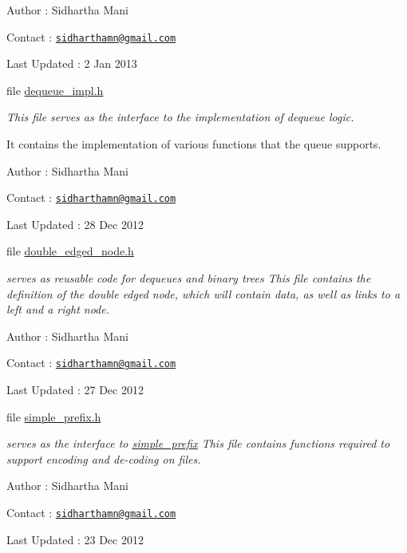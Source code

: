 \begin{DoxyCompactItemize}
\begin{DoxyCompactList}
 Author \-: Sidhartha Mani\par
 Contact \-: \href{mailto:sidharthamn@gmail.com}{\tt sidharthamn@gmail.\-com} \par
 Last Updated \-: 2 Jan 2013\par
 \end{DoxyCompactList}\item 
file \hyperlink{dequeue__impl_8h}{dequeue\-\_\-impl.\-h}
\begin{DoxyCompactList}\small\item\em This file serves as the interface to the implementation of dequeue logic. \par
 It contains the implementation of various functions that the queue supports.\par
 Author \-: Sidhartha Mani\par
 Contact \-: \href{mailto:sidharthamn@gmail.com}{\tt sidharthamn@gmail.\-com} \par
 Last Updated \-: 28 Dec 2012\par
 \end{DoxyCompactList}\item 
file \hyperlink{double__edged__node_8h}{double\-\_\-edged\-\_\-node.\-h}
\begin{DoxyCompactList}\small\item\em serves as reusable code for dequeues and binary trees This file contains the definition of the double edged node, which will contain data, as well as links to a left and a right node.\par
 Author \-: Sidhartha Mani\par
 Contact \-: \href{mailto:sidharthamn@gmail.com}{\tt sidharthamn@gmail.\-com} \par
 Last Updated \-: 27 Dec 2012\par
 \end{DoxyCompactList}\item 
file \hyperlink{simple__prefix_8h}{simple\-\_\-prefix.\-h}
\begin{DoxyCompactList}\small\item\em serves as the interface to \hyperlink{structsimple__prefix}{simple\-\_\-prefix} This file contains functions required to support encoding and de-\/coding on files.\par
 Author \-: Sidhartha Mani\par
 Contact \-: \href{mailto:sidharthamn@gmail.com}{\tt sidharthamn@gmail.\-com} \par
 Last Updated \-: 23 Dec 2012 \par

\end{DoxyCompactList}
\end{DoxyCompactItemize}
